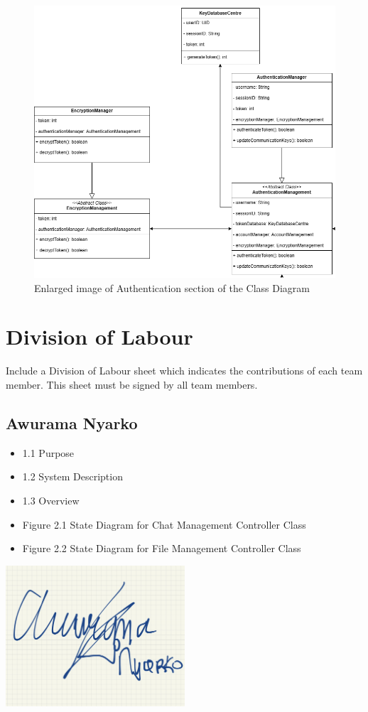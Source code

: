 \documentclass[]{article}
\begin{document}
\begin{figure}[H]
	\centering
	\includegraphics[width=1\textwidth]{authentication-class-diagram.png}
	\caption{Enlarged image of Authentication section of the Class Diagram}
	\label{fig:class-diagram}
\end{figure}

\newpage
\appendix
\section{Division of Labour}
\label{sec:division_of_labour}
Include a Division of Labour sheet which indicates the contributions of each team member. This sheet must be signed by all team members.
\subsection{Awurama Nyarko}
\label{subsec:awurama_nyarko}
\begin{itemize}
	\item 1.1 Purpose
	\item 1.2 System Description
	\item 1.3 Overview
	\item Figure 2.1 State Diagram for Chat Management Controller Class
	\item Figure 2.2 State Diagram for File Management Controller Class
\end{itemize}
\includegraphics[width=0.5\textwidth]{awurama.jpg}
\end{document}
